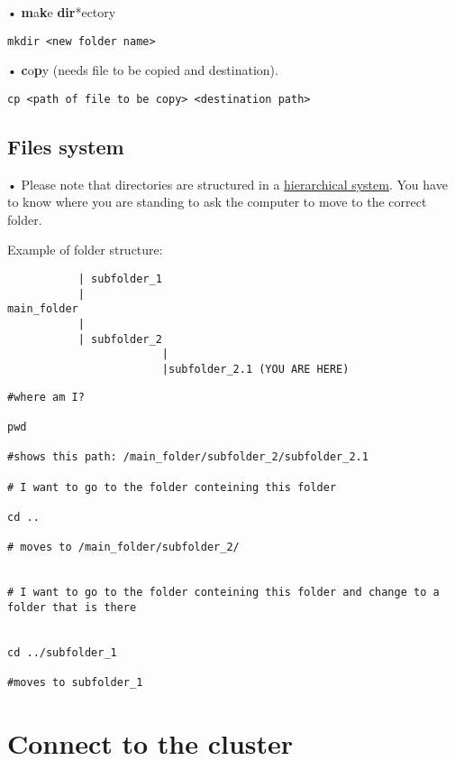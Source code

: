 \documentclass[
]{book}
\begin{document}
• \textbf{m}a\textbf{k}e \textbf{dir}*ectory

\begin{verbatim}
mkdir <new folder name>
\end{verbatim}

• \textbf{c}o\textbf{p}y (needs file to be copied and destination).

\begin{verbatim}
cp <path of file to be copy> <destination path>
\end{verbatim}

\hypertarget{files-system}{%
\section{Files system}\label{files-system}}

• Please note that directories are structured in a \href{https://www.geeksforgeeks.org/structures-of-directory-in-operating-system/}{hierarchical system}. You have to know where you are standing to ask the computer to move to the correct folder.

Example of folder structure:

\begin{verbatim}
           | subfolder_1 
           | 
main_folder
           |
           | subfolder_2
                        |
                        |subfolder_2.1 (YOU ARE HERE)
\end{verbatim}

\begin{verbatim}
#where am I?

pwd

#shows this path: /main_folder/subfolder_2/subfolder_2.1

# I want to go to the folder conteining this folder

cd ..

# moves to /main_folder/subfolder_2/


# I want to go to the folder conteining this folder and change to a folder that is there


cd ../subfolder_1

#moves to subfolder_1
\end{verbatim}

\hypertarget{connect-to-the-cluster}{%
\chapter{Connect to the cluster}\label{connect-to-the-cluster}}
\end{document}
